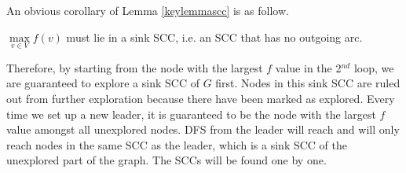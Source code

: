 An obvious corollary of Lemma \ref{keylemmascc} is as follow.
\begin{corollary}\label{corollaryscc}
$\max\limits_{v\in V}f(v)$ must lie in a sink SCC, i.e. an SCC that has no outgoing arc. 
\end{corollary}
Therefore, by starting from the node with the largest $f$ value in the 2$^{nd}$ loop, we are guaranteed to explore a sink SCC of $G$ first. Nodes in this sink SCC are ruled out from further exploration because there have been marked as explored. Every time we set up a new leader, it is guaranteed to be the node with the largest $f$ value amongst all unexplored nodes. DFS from the leader will reach and will only reach nodes in the same SCC as the leader, which is a sink SCC of the unexplored part of the graph. The SCCs will be found one by one.
\ifx\PREAMBLE\undefined

\fi